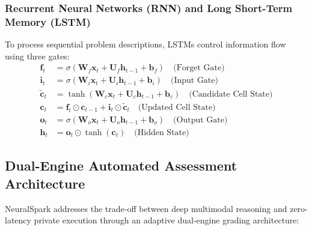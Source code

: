 \subsubsection{Recurrent Neural Networks (RNN) and Long Short-Term Memory (LSTM)}
To process sequential problem descriptions, LSTMs control information flow using three gates:
\begin{align}
    \mathbf{f}_t &= \sigma\left( \mathbf{W}_f \mathbf{x}_t + \mathbf{U}_f \mathbf{h}_{t-1} + \mathbf{b}_f \right) \quad \text{(Forget Gate)} \\
    \mathbf{i}_t &= \sigma\left( \mathbf{W}_i \mathbf{x}_t + \mathbf{U}_i \mathbf{h}_{t-1} + \mathbf{b}_i \right) \quad \text{(Input Gate)} \\
    \tilde{\mathbf{c}}_t &= \tanh\left( \mathbf{W}_c \mathbf{x}_t + \mathbf{U}_c \mathbf{h}_{t-1} + \mathbf{b}_c \right) \quad \text{(Candidate Cell State)} \\
    \mathbf{c}_t &= \mathbf{f}_t \odot \mathbf{c}_{t-1} + \mathbf{i}_t \odot \tilde{\mathbf{c}}_t \quad \text{(Updated Cell State)} \\
    \mathbf{o}_t &= \sigma\left( \mathbf{W}_o \mathbf{x}_t + \mathbf{U}_o \mathbf{h}_{t-1} + \mathbf{b}_o \right) \quad \text{(Output Gate)} \\
    \mathbf{h}_t &= \mathbf{o}_t \odot \tanh(\mathbf{c}_t) \quad \text{(Hidden State)}
\end{align}

\subsection{Dual-Engine Automated Assessment Architecture}
NeuralSpark addresses the trade-off between deep multimodal reasoning and zero-latency private execution through an adaptive dual-engine grading architecture:

